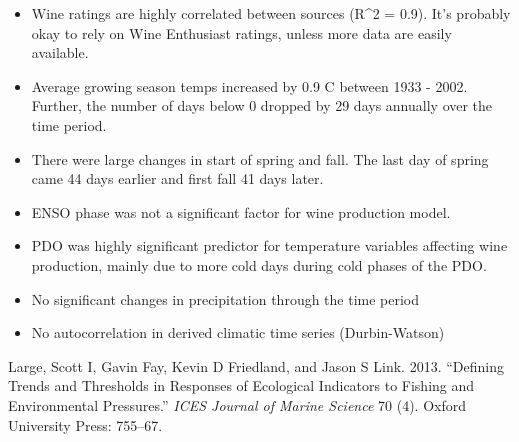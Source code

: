 \begin{itemize}
  \item
    Wine ratings are highly correlated between sources (R^2 = 0.9). It's probably okay to rely on Wine Enthusiast ratings, unless more data are easily available.
  \item
    Average growing season temps increased by 0.9 \textdegree C between 1933 - 2002. Further, the number of days below 0 dropped by 29 days annually over the time period. 
  \item
    There were large changes in start of spring and fall. The last day of spring came 44 days earlier and first fall 41 days later.
  \item
    ENSO phase was not a significant factor for wine production model. 
  \item
    PDO was highly significant predictor for temperature variables affecting wine production, mainly due to more cold days during cold phases of the PDO. 
  \item
    No significant changes in precipitation through the time period
  \item
    No autocorrelation in derived climatic time series (Durbin-Watson)
    
\end{itemize}

\hypertarget{ref-large2013}{}
Large, Scott I, Gavin Fay, Kevin D Friedland, and Jason S Link. 2013.
``Defining Trends and Thresholds in Responses of Ecological Indicators
to Fishing and Environmental Pressures.'' \emph{ICES Journal of Marine
Science} 70 (4). Oxford University Press: 755--67.


